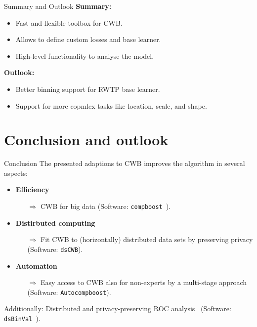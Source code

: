 \documentclass[t,10pt]{beamer}
\begin{document}
\begin{frame}{Summary and Outlook}
  \textbf{Summary:}
  \begin{itemize}
    \item Fast and flexible toolbox for CWB.
    \item Allows to define custom losses and base learner.
    \item High-level functionality to analyse the model.
  \end{itemize}
  \textbf{Outlook:}
  \begin{itemize}
    \item Better binning support for RWTP base learner.
    \item Support for more copmlex tasks like location, scale, and shape.
  \end{itemize}
\end{frame}

\section{Conclusion and outlook}

\begin{frame}{Conclusion}
      The presented adaptions to CWB improves the algorithm in several aspects:
      \begin{itemize}
        \item
          \textbf{Efficiency}~\citep{schalk2022accelerated}
        \begin{itemize}
          \item[$\Rightarrow$]
            CWB for big data (Software: \texttt{compboost}~\citep{schalk2018compboost}).
        \end{itemize}
        \item
          \textbf{Distirbuted computing}~\citep{schalk2022distcwb}
            \begin{itemize}
              \item[$\Rightarrow$]
                Fit CWB to (horizontally) distributed data sets by preserving privacy (Software: \texttt{dsCWB}).
            \end{itemize}
        \item \textbf{Automation}~\citep{coors2021autocompboost}
          \begin{itemize}\item[$\Rightarrow$]
            Easy access to CWB also for non-experts by a multi-stage approach (Software: \texttt{Autocompboost}).
          \end{itemize}
      \end{itemize}
      Additionally: Distributed and privacy-preserving ROC analysis~\citep{schalk2022dauc} (Software: \texttt{dsBinVal}~\citep{schalk2022dsBinVal}).
\end{frame}
\end{document}
